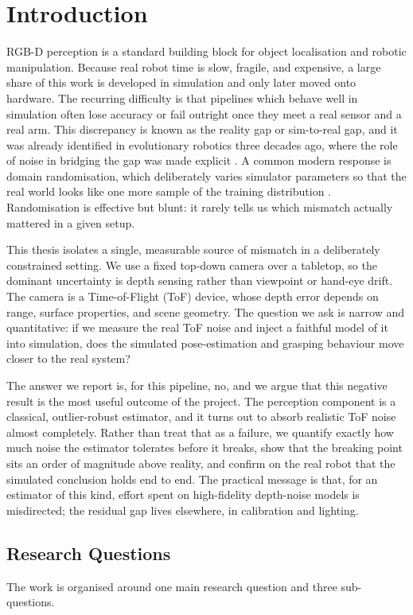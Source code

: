 \section{Introduction}
RGB-D perception is a standard building block for object localisation and robotic
manipulation. Because real robot time is slow, fragile, and expensive, a large share of
this work is developed in simulation and only later moved onto hardware. The recurring
difficulty is that pipelines which behave well in simulation often lose accuracy or fail
outright once they meet a real sensor and a real arm. This discrepancy is known as the
reality gap or sim-to-real gap, and it was already identified in evolutionary robotics
three decades ago, where the role of noise in bridging the gap was made explicit
\cite{jakobi1995noise}. A common modern response is domain randomisation, which
deliberately varies simulator parameters so that the real world looks like one more
sample of the training distribution \cite{tobin2017domain}. Randomisation is effective
but blunt: it rarely tells us which mismatch actually mattered in a given setup.

This thesis isolates a single, measurable source of mismatch in a deliberately
constrained setting. We use a fixed top-down camera over a tabletop, so the dominant
uncertainty is depth sensing rather than viewpoint or hand-eye drift. The camera is a
Time-of-Flight (ToF) device, whose depth error depends on range, surface properties, and
scene geometry. The question we ask is narrow and quantitative: if we measure the real
ToF noise and inject a faithful model of it into simulation, does the simulated
pose-estimation and grasping behaviour move closer to the real system?

The answer we report is, for this pipeline, no, and we argue that this negative result is
the most useful outcome of the project. The perception component is a classical,
outlier-robust estimator, and it turns out to absorb realistic ToF noise almost
completely. Rather than treat that as a failure, we quantify exactly how much noise the
estimator tolerates before it breaks, show that the breaking point sits an order of
magnitude above reality, and confirm on the real robot that the simulated conclusion
holds end to end. The practical message is that, for an estimator of this kind, effort
spent on high-fidelity depth-noise models is misdirected; the residual gap lives
elsewhere, in calibration and lighting.

\subsection{Research Questions}
The work is organised around one main research question and three sub-questions.

